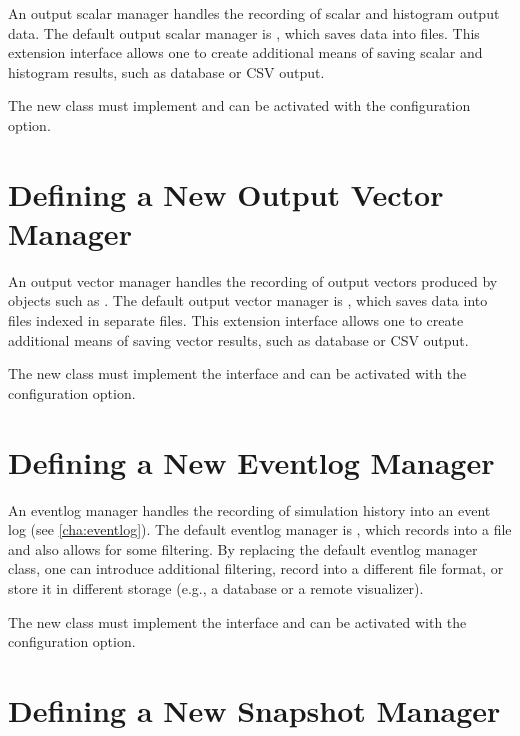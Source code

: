 An output scalar manager handles the recording of scalar and histogram
output data. The default output scalar manager is
, which saves data into  files.
This extension interface allows one to create additional means of saving
scalar and histogram results, such as database or CSV output.

The new class must implement  and can be
activated with the  configuration
option.


\section{Defining a New Output Vector Manager}
\label{sec:plugin-exts:outputvectormanager}

An output vector manager handles the recording of output vectors produced
by objects such as . The default output vector
manager is , which saves data into
 files indexed in separate  files. This extension
interface allows one to create additional means of saving vector results,
such as database or CSV output.

The new class must implement the  interface
and can be activated with the 
configuration option.


\section{Defining a New Eventlog Manager}
\label{sec:plugin-exts:eventlogmanager}

An eventlog manager handles the recording of simulation history into an
event log (see \ref{cha:eventlog}). The default eventlog manager is
, which records into a file and also allows
for some filtering. By replacing the default eventlog manager class, one can
introduce additional filtering, record into a different file format, or
store it in different storage (e.g., a database or a remote visualizer).

The new class must implement the  interface
and can be activated with the  configuration
option.


\section{Defining a New Snapshot Manager}
\label{sec:plugin-exts:snapshotmanager}

